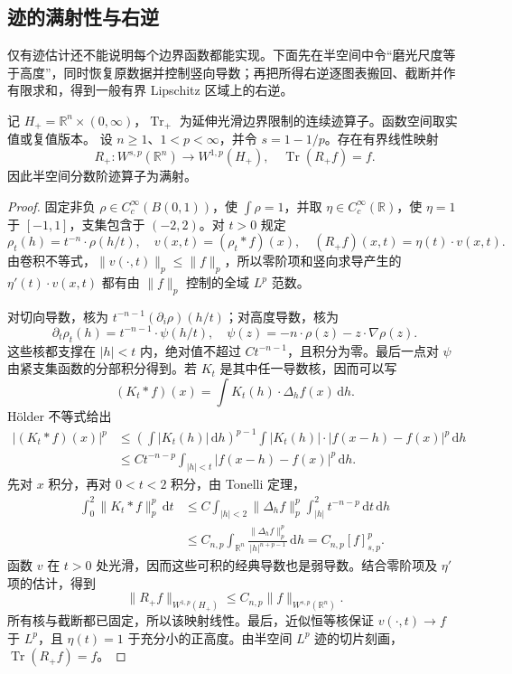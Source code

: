 \subsection{迹的满射性与右逆}
\label{b1:subsec:230303}

仅有迹估计还不能说明每个边界函数都能实现。下面先在半空间中令“磨光尺度等于高度”，同时恢复原数据并控制竖向导数；再把所得右逆逐图表搬回、截断并作有限求和，得到一般有界 Lipschitz 区域上的右逆。

\begin{theorem}\label{b1:thm:half-space-trace-right-inverse}
记 \(H_+=\mathbb R^n\times(0,\infty)\)，\(\operatorname{Tr}_+\) 为延伸光滑边界限制的连续迹算子。函数空间取实值或复值版本。
设 \(n\ge1\)、\(1<p<\infty\)，并令 \(s=1-1/p\)。存在有界线性映射
\[
 R_+:W^{s,p}(\mathbb R^n)\longrightarrow W^{1,p}(H_+),
 \quad \operatorname{Tr}(R_+f)=f.
\]
因此半空间分数阶迹算子为满射。
\end{theorem}
\begin{proof}
固定非负 \(\rho\in C_c^\infty(B(0,1))\)，使 \(\int\rho=1\)，并取 \(\eta\in C_c^\infty(\mathbb R)\)，使 \(\eta=1\) 于 \([-1,1]\)，支集包含于 \((-2,2)\)。对 \(t>0\) 规定
\[
 \rho_t(h)=t^{-n}\cdot \rho(h/t),\quad
 v(x,t)=(\rho_t*f)(x),\quad
 (R_+f)(x,t)=\eta(t)\cdot v(x,t).
\]
由卷积不等式，\(\|v(\cdot,t)\|_p\le\|f\|_p\)，所以零阶项和竖向求导产生的 \(\eta'(t)\cdot v(x,t)\) 都有由 \(\|f\|_p\) 控制的全域 \(L^p\) 范数。

对切向导数，核为 \(t^{-n-1}(\partial_i\rho)(h/t)\)；对高度导数，核为
\[
 \partial_t\rho_t(h)=t^{-n-1}\cdot \psi(h/t),\quad
 \psi(z)=-n\cdot \rho(z)-z\cdot\nabla\rho(z).
\]
这些核都支撑在 \(|h|<t\) 内，绝对值不超过 \(Ct^{-n-1}\)，且积分为零。最后一点对 \(\psi\) 由紧支集函数的分部积分得到。若 \(K_t\) 是其中任一导数核，因而可以写
\[
 (K_t*f)(x)=\int K_t(h)\cdot\Delta_hf(x)\,\mathrm dh.
\]
Hölder 不等式给出
\[
 \begin{split}
 |(K_t*f)(x)|^p
 &\le\left(\int|K_t(h)|\,\mathrm dh\right)^{p-1}
       \int|K_t(h)|\cdot|f(x-h)-f(x)|^p\,\mathrm dh\\
 &\le Ct^{-n-p}\int_{|h|<t}|f(x-h)-f(x)|^p\,\mathrm dh.
 \end{split}
\]
先对 \(x\) 积分，再对 \(0<t<2\) 积分，由 Tonelli 定理，
\[
 \begin{split}
 \int_0^2\|K_t*f\|_p^p\,\mathrm dt
 &\le C\int_{|h|<2}\|\Delta_hf\|_p^p
                  \int_{|h|}^2t^{-n-p}\,\mathrm dt\,\mathrm dh\\
 &\le C_{n,p}\int_{\mathbb R^n}
        \frac{\|\Delta_hf\|_p^p}{|h|^{n+p-1}}\,\mathrm dh
 =C_{n,p}[f]_{s,p}^p.
 \end{split}
\]
函数 \(v\) 在 \(t>0\) 处光滑，因而这些可积的经典导数也是弱导数。结合零阶项及 \(\eta'\) 项的估计，得到
\[
 \|R_+f\|_{W^{1,p}(H_+)}
 \le C_{n,p}\|f\|_{W^{s,p}(\mathbb R^n)}.
\]
所有核与截断都已固定，所以该映射线性。最后，近似恒等核保证 \(v(\cdot,t)\to f\) 于 \(L^p\)，且 \(\eta(t)=1\) 于充分小的正高度。由半空间 \(L^p\) 迹的切片刻画，\(\operatorname{Tr}(R_+f)=f\)。
\end{proof}

